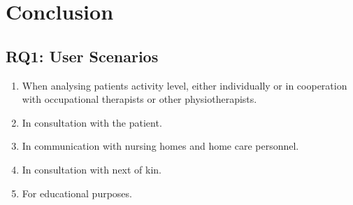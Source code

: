 \chapter{Conclusion}

\section{RQ1: User Scenarios}


\begin{enumerate}[itemsep=0cm, parsep=0cm]
\item When analysing patients activity level, either individually or in cooperation with occupational therapists or other physiotherapists.
\item In consultation with the patient.
\item In communication with nursing homes and home care personnel.
\item In consultation with next of kin.
\item For educational purposes.
\end{enumerate}


